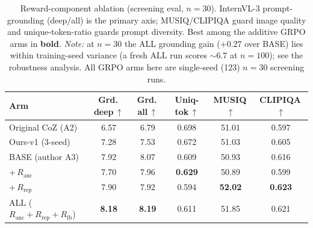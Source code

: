 \begin{table}[t]
\centering
\caption{Reward-component ablation (screening eval, $n{=}30$). InternVL-3 prompt-grounding (deep/all) is the primary axis; MUSIQ/CLIPIQA guard image quality and unique-token-ratio guards prompt diversity. Best among the additive GRPO arms in \textbf{bold}. \emph{Note:} at $n{=}30$ the ALL grounding gain ($+0.27$ over BASE) lies within training-seed variance (a fresh ALL run scores $\sim\!6.7$ at $n{=}100$); see the robustness analysis. All GRPO arms here are single-seed (123) $n{=}30$ screening runs.}
\label{tab:reward_ablation}
\begin{tabular}{lccccc}
\toprule
Arm & Grd.\,deep\,$\uparrow$ & Grd.\,all\,$\uparrow$ & Uniq-tok\,$\uparrow$ & MUSIQ\,$\uparrow$ & CLIPIQA\,$\uparrow$ \\
\midrule
Original CoZ (A2) & 6.57 & 6.79 & 0.698 & 51.01 & 0.597 \\
Ours-v1 (3-seed) & 7.28 & 7.53 & 0.672 & 51.03 & 0.605 \\
\midrule
BASE (author A3) & 7.92 & 8.07 & 0.609 & 50.93 & 0.616 \\
\quad +\,$R_{\mathrm{anc}}$ & 7.70 & 7.96 & \textbf{0.629} & 50.89 & 0.599 \\
\quad +\,$R_{\mathrm{rep}}$ & 7.90 & 7.92 & 0.594 & \textbf{52.02} & \textbf{0.623} \\
\quad ALL ($R_{\mathrm{anc}}{+}R_{\mathrm{rep}}{+}R_{\mathrm{fb}}$) & \textbf{8.18} & \textbf{8.19} & 0.611 & 51.85 & 0.621 \\
\bottomrule
\end{tabular}
\end{table}
